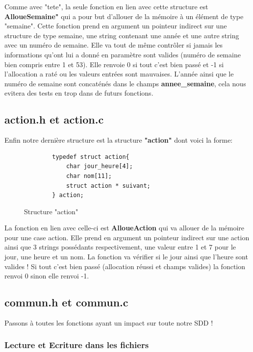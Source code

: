 \documentclass[12pt,french]{article} %
\begin{document}
Comme avec "tete", la seule fonction en lien avec cette structure est \textbf{AlloueSemaine"} qui a pour but d'allouer de la mémoire à un élément de type "semaine". Cette fonction prend en argument un pointeur indirect sur une structure de type semaine, une string contenant une année et une autre string avec un numéro de semaine. Elle va tout de même contrôler si jamais les informations qu'ont lui a donné en paramètre sont valides (numéro de semaine bien compris entre 1 et 53).  Elle renvoie 0 si tout c'est bien passé et -1 si l'allocation a raté ou les valeurs entrées sont mauvaises. L'année ainsi que le numéro de semaine sont concaténés dans le champs \textbf{annee\_semaine}, cela nous evitera des tests en trop dans de futurs fonctions.

\subsection{action.h et action.c}
Enfin notre dernière structure est la structure \textbf{"action"} dont voici la forme:

\begin{figure}[H]
	\begin{lstlisting}
		typedef struct action{
			char jour_heure[4];
			char nom[11];
			struct action * suivant;
		} action;
	\end{lstlisting}
	\caption{Structure "action"}
\end{figure}

La fonction en lien avec celle-ci est \textbf{AlloueAction} qui va allouer de la mémoire pour une case action. Elle prend en argument un pointeur indirect sur une action ainsi que 3 strings possédants respectivement, une valeur entre 1 et 7 pour le jour, une heure et un nom. La fonction va vérifier si le jour ainsi que l'heure sont valides ! Si tout c'est bien passé (allocation réussi et champs valides) la fonction renvoi 0 sinon elle renvoi -1.

\subsection{commun.h et commun.c}

Passons à toutes les fonctions ayant un impact sur toute notre SDD !

\subsubsection{Lecture et Ecriture dans les fichiers}
\end{document}
